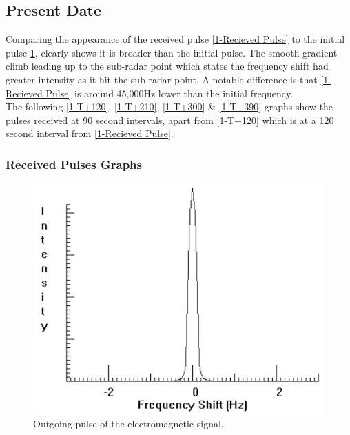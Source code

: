 \documentclass[11pt]{article}
\begin{document}
\begin{multicols}{2}

\subsection{Present Date}\label{Present date data}

Comparing the appearance of the received pulse \cref{1-Recieved Pulse} to the initial pulse \cref{1-Outgoing Pulse}, clearly shows it is broader than the initial pulse. The smooth gradient climb leading up to the sub-radar point which states the frequency shift had greater intensity as it hit the sub-radar point. A notable difference is that \cref{1-Recieved Pulse} is around 45,000Hz lower than the initial frequency.\\

The following \cref{1-T+120}, \cref{1-T+210}, \cref{1-T+300} \& \cref{1-T+390} graphs show the pulses received at 90 second intervals, apart from \cref{1-T+120} which is at a 120 second interval from \cref{1-Recieved Pulse}.

\subsubsection{Received Pulses Graphs}\label{Present Graphs}

\begin{figure}[H]
\centering
\includegraphics[scale=0.7]{Present_Images.png/1_-_Outgoing_Pulse.png}
\caption{Outgoing pulse of the electromagnetic signal.}
\label{1-Outgoing Pulse}
\end{figure}


\end{multicols}
\end{document}

